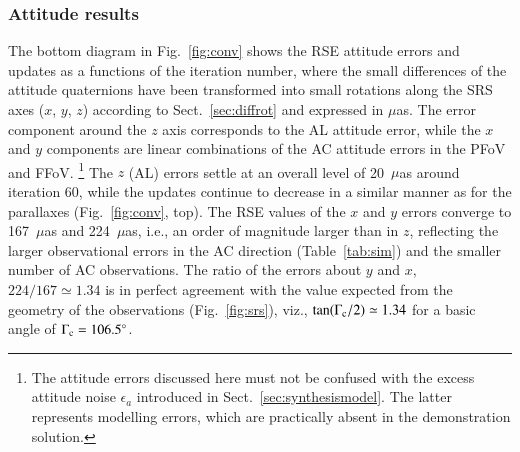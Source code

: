 \documentclass[structabstract]{aa}
\begin{document}
\subsubsection{Attitude results\label{sec:resatt}}

The bottom diagram in Fig.~\ref{fig:conv} shows the RSE attitude errors and updates
as a functions of the iteration number, where the small differences of the attitude
quaternions have been transformed into small rotations along the SRS axes
($x$, $y$, $z$) according to Sect.~\ref{sec:diffrot} and expressed in 
$\mu$as. The error component around the $z$ axis corresponds to the AL
attitude error, while the $x$ and $y$ components are linear combinations of
the AC attitude errors in the PFoV and FFoV.%
\footnote{The attitude errors discussed here must not be confused with the 
excess attitude noise $\epsilon_a$ introduced in Sect.~\ref{sec:synthesismodel}.
The latter represents modelling errors, which are practically absent in the 
demonstration solution.}
The $z$ (AL) errors settle at an 
overall level of 20~$\mu$as around iteration 60, while the updates 
continue to decrease in a similar manner as for the parallaxes
(Fig.~\ref{fig:conv}, top).
The RSE values of the $x$ and $y$ errors converge to 167~$\mu$as and
224~$\mu$as, i.e., an order of magnitude larger than in $z$, reflecting the larger
observational errors in the AC direction (Table~\ref{tab:sim}) and the
smaller number of AC observations. The ratio of the errors about $y$ and
$x$,  $224/167\simeq 1.34$ is in perfect agreement with the value
expected from the geometry of the observations (Fig.~\ref{fig:srs}), viz.,
$\tan(\Gamma_{\rm c}/2)\simeq 1.34$ for a basic angle of
$\Gamma_{\rm c}=106.5^\circ$.
\end{document}
